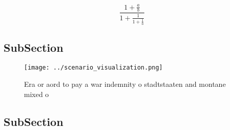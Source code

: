 \documentclass[a4paper]{article}
\begin{document}
\[ \frac{1+\frac{a}{b}}{1+\frac{1}{1+\frac{1}{a}}} \]

\subsection{SubSection}

\begin{figure}
\centering
\texttt{[image: ../scenario\_visualization.png]}
\caption{Era or aord to pay a war indemnity o stadtstaaten and montane mixed o
}
\end{figure}
 
\subsection{SubSection}
\end{document}
